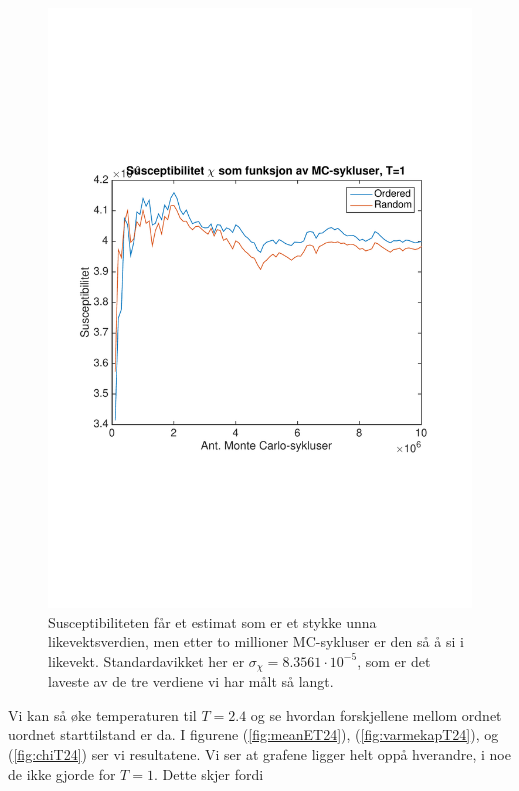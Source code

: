 \documentclass[norsk, 10pt]{article}
\begin{document}
\begin{figure}[H]
\centering
\includegraphics[scale = 0.6, trim = 1cm 8cm 1cm 8cm]{b_chi_MC_L2_T1.pdf}
\caption{Susceptibiliteten får et estimat som er et stykke unna likevektsverdien, men etter to millioner MC-sykluser er den så å si i likevekt. Standardavikket her er $\sigma_\chi = 8.3561\cdot10^{-5}$, som er det laveste av de tre verdiene vi har målt så langt.}
\label{fig:chiT1}
\end{figure}

Vi kan så øke temperaturen til $T=2.4$ og se hvordan forskjellene mellom ordnet uordnet starttilstand er da. I figurene (\ref{fig:meanET24}), (\ref{fig:varmekapT24}), og (\ref{fig:chiT24}) ser vi resultatene. Vi ser at grafene ligger helt oppå hverandre, i noe de ikke gjorde for $T=1$. Dette skjer fordi 
\end{document}
